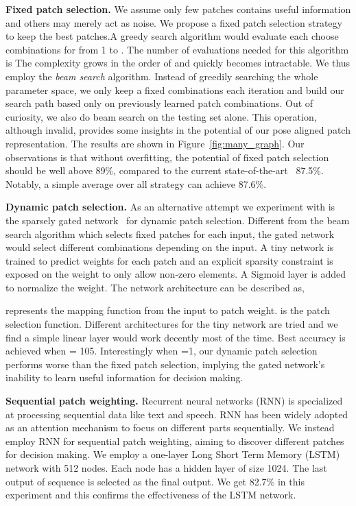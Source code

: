 \noindent\textbf{Fixed patch selection.}
We assume only few patches contains useful information and others may merely act as noise.
We propose a fixed patch selection strategy to keep the best  patches.A greedy search algorithm would evaluate each  choose   combinations for   from 1 to . 
The number of evaluations needed for this algorithm is 
The complexity grows in the order of  and quickly becomes intractable. 
We thus employ the \emph{beam search} algorithm.
Instead of greedily searching the whole parameter space, we only keep a fixed  combinations each iteration and build our search path based only on previously learned  patch combinations. 
Out of curiosity,
we also do beam search on the testing set alone. 
This operation, although invalid, provides some insights in the potential of our pose aligned patch representation. 
The results are shown in Figure~\ref{fig:many_graph}.
Our observations is that without overfitting, the potential of fixed patch selection should be well above 89\%, compared to the current state-of-the-art~\cite{LamMT_CVPR2017} 87.5\%. Notably, a simple average over all strategy can achieve 87.6\%.


\noindent\textbf{Dynamic patch selection.} As an alternative attempt 
we experiment with is the sparsely gated network~\cite{ShazeerMMDLHD_ArXiv2017} for dynamic patch selection. 
Different from the beam search algorithm which selects fixed patches for each input,
the gated network would select different combinations depending on the input.
A tiny network is trained to predict weights for each patch and an explicit sparsity constraint is exposed on the weight to only allow  non-zero elements. 
A Sigmoid layer is added to normalize the weight.
The network architecture can be described as,

 represents the mapping function from the input to patch weight.  is the patch selection function.
Different architectures for the tiny network are tried and we find a simple linear layer would work decently most of the time.
Best accuracy is achieved when  = 105. 
Interestingly when =1, our dynamic patch selection performs worse than the fixed patch selection, implying the gated network's inability to learn useful information for decision making.

\noindent\textbf{Sequential patch weighting.} Recurrent neural networks (RNN) is specialized at processing sequential data like text and speech.
 RNN has been widely adopted as an attention mechanism to focus on different parts sequentially. We instead employ RNN for sequential patch weighting, aiming to discover different patches for decision making.
We employ a one-layer Long Short Term Memory (LSTM) network with 512 nodes. Each node has a hidden layer of size 1024. 
The last output of sequence is selected as the final output.
We get 82.7\% in this experiment and this confirms the effectiveness of the LSTM network.

